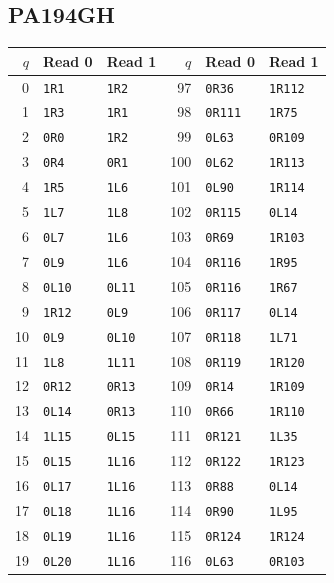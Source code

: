 \subsection{PA194GH}
{\small
\begin{longtable}{@{}rll@{\qquad\quad}rll@{}}
\toprule $q$ & Read 0 & Read 1 & $q$ & Read 0 & Read 1\\
\midrule\endhead
0 & \texttt{1R1} & \texttt{1R2} & 97 & \texttt{0R36} & \texttt{1R112}\\
1 & \texttt{1R3} & \texttt{1R1} & 98 & \texttt{0R111} & \texttt{1R75}\\
2 & \texttt{0R0} & \texttt{1R2} & 99 & \texttt{0L63} & \texttt{0R109}\\
3 & \texttt{0R4} & \texttt{0R1} & 100 & \texttt{0L62} & \texttt{1R113}\\
4 & \texttt{1R5} & \texttt{1L6} & 101 & \texttt{0L90} & \texttt{1R114}\\
5 & \texttt{1L7} & \texttt{1L8} & 102 & \texttt{0R115} & \texttt{0L14}\\
6 & \texttt{0L7} & \texttt{1L6} & 103 & \texttt{0R69} & \texttt{1R103}\\
7 & \texttt{0L9} & \texttt{1L6} & 104 & \texttt{0R116} & \texttt{1R95}\\
8 & \texttt{0L10} & \texttt{0L11} & 105 & \texttt{0R116} & \texttt{1R67}\\
9 & \texttt{1R12} & \texttt{0L9} & 106 & \texttt{0R117} & \texttt{0L14}\\
10 & \texttt{0L9} & \texttt{0L10} & 107 & \texttt{0R118} & \texttt{1L71}\\
11 & \texttt{1L8} & \texttt{1L11} & 108 & \texttt{0R119} & \texttt{1R120}\\
12 & \texttt{0R12} & \texttt{0R13} & 109 & \texttt{0R14} & \texttt{1R109}\\
13 & \texttt{0L14} & \texttt{0R13} & 110 & \texttt{0R66} & \texttt{1R110}\\
14 & \texttt{1L15} & \texttt{0L15} & 111 & \texttt{0R121} & \texttt{1L35}\\
15 & \texttt{0L15} & \texttt{1L16} & 112 & \texttt{0R122} & \texttt{1R123}\\
16 & \texttt{0L17} & \texttt{1L16} & 113 & \texttt{0R88} & \texttt{0L14}\\
17 & \texttt{0L18} & \texttt{1L16} & 114 & \texttt{0R90} & \texttt{1L95}\\
18 & \texttt{0L19} & \texttt{1L16} & 115 & \texttt{0R124} & \texttt{1R124}\\
19 & \texttt{0L20} & \texttt{1L16} & 116 & \texttt{0L63} & \texttt{0R103}\\

\end{longtable}}
